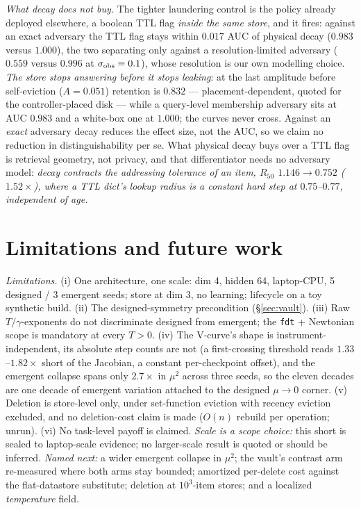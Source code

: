 \emph{What decay does not buy.} The tighter laundering control is the policy already deployed elsewhere, a boolean TTL flag \emph{inside the same store}, and it fires: against an exact adversary the TTL flag stays within $0.017$ AUC of physical decay ($0.983$ versus $1.000$), the two separating only against a resolution-limited adversary ($0.559$ versus $0.996$ at $\sigma_{\rm obs}=0.1$), whose resolution is our own modelling choice. \emph{The store stops answering before it stops leaking}: at the last amplitude before self-eviction ($A=0.051$) retention is $0.832$ --- placement-dependent, quoted for the controller-placed disk --- while a query-level membership adversary sits at AUC $0.983$ and a white-box one at $1.000$; the curves never cross. Against an \emph{exact} adversary decay reduces the effect size, not the AUC, so we claim no reduction in distinguishability per se. What physical decay buys over a TTL flag is retrieval geometry, not privacy, and that differentiator needs no adversary model: \emph{decay contracts the addressing tolerance of an item, $R_{50}$ $1.146\to0.752$ ($1.52\times$), where a TTL dict's lookup radius is a constant hard step at $0.75$--$0.77$, independent of age.}

\section{Limitations and future work}\label{sec:limits}

{\scriptsize\emph{Limitations.} (i) One architecture, one scale: dim 4, hidden 64, laptop-CPU, 5 designed / 3 emergent seeds; store at dim 3, no learning; lifecycle on a toy synthetic build. (ii) The designed-symmetry precondition (\S\ref{sec:vault}). (iii) Raw $T/\gamma$-exponents do not discriminate designed from emergent; the \texttt{fdt} + Newtonian scope is mandatory at every $T>0$. (iv) The V-curve's shape is instrument-independent, its absolute step counts are not (a first-crossing threshold reads $1.33$--$1.82\times$ short of the Jacobian, a constant per-checkpoint offset), and the emergent collapse spans only $2.7\times$ in $\mu^2$ across three seeds, so the eleven decades are one decade of emergent variation attached to the designed $\mu\to0$ corner. (v) Deletion is store-level only, under set-function eviction with recency eviction excluded, and no deletion-cost claim is made ($O(n)$ rebuild per operation; unrun). (vi) No task-level payoff is claimed. \emph{Scale is a scope choice:} this short is sealed to laptop-scale evidence; no larger-scale result is quoted or should be inferred. \emph{Named next:} a wider emergent collapse in $\mu^2$; the vault's contrast arm re-measured where both arms stay bounded; amortized per-delete cost against the flat-datastore substitute; deletion at $10^3$-item stores; and a localized \emph{temperature} field.\par}
